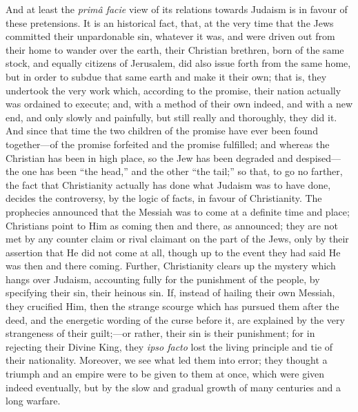 And at least the \emph{primâ facie} view of its relations towards
Judaism is in favour of these pretensions. It is an historical fact,
that, at the very time that the Jews committed their unpardonable sin,
whatever it was, and were driven out from their home to wander over
the earth, their Christian brethren, born of the same stock, and
equally citizens of Jerusalem, did also issue forth from the same
home, but in order to subdue that same earth and make it their own;
that is, they undertook the very work which, according to the promise,
their nation actually was ordained to execute; and, with a method of
their own indeed, and with a new end, and only slowly and
painfully, but still really and thoroughly, they did it. And since
that time the two children of the promise have ever been found
together—of the promise forfeited and the promise fulfilled; and
whereas the Christian has been in high place, so the Jew has been
degraded and despised—the one has been ``the head,'' and the
other ``the tail;'' so that, to go no farther, the fact that
Christianity actually has done what Judaism was to have done, decides
the controversy, by the logic of facts, in favour of Christianity. The
prophecies announced that the Messiah was to come at a definite time
and place; Christians point to Him as coming then and there, as
announced; they are not met by any counter claim or rival claimant on
the part of the Jews, only by their assertion that He did not come at
all, though up to the event they had said He was then and there
coming. Further, Christianity clears up the mystery which hangs over
Judaism, accounting fully for the punishment of the people, by
specifying their sin, their heinous sin. If, instead of hailing their
own Messiah, they crucified Him, then the strange scourge which has
pursued them after the deed, and the energetic wording of the curse
before it, are explained by the very strangeness of their guilt;—or
rather, their sin is their punishment; for in rejecting their Divine
King, they \emph{ipso facto} lost the living principle and tie of
their nationality. Moreover, we see what led them into error; they
thought a triumph and an empire were to be given to them at once,
which were given indeed eventually, but by the slow and gradual growth
of many centuries and a long warfare.

